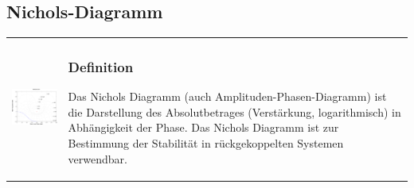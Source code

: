 \subsection{Nichols-Diagramm  }
\begin{tabular}{ll}
	\parbox{7cm}{
		\includegraphics[width=7cm]{./bilder/nichols.png}
	}
	& \parbox{11cm}{
		\subsubsection{Definition}
		Das Nichols Diagramm (auch Amplituden-Phasen-Diagramm) ist die Darstellung des
		Absolutbetrages (Verstärkung, logarithmisch) in Abhängigkeit der Phase. Das Nichols Diagramm ist zur
		Bestimmung der Stabilität in rückgekoppelten Systemen verwendbar.
	}
\end{tabular}
